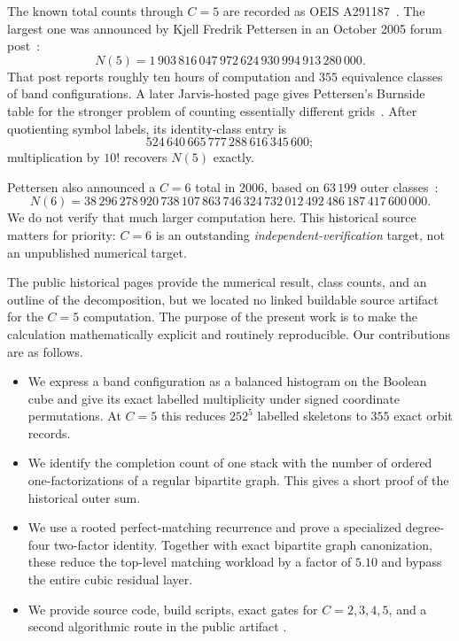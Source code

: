 \documentclass[11pt]{article}
\theoremstyle{definition}
\theoremstyle{remark}
\newcommand{\Nfive}{1\,903\,816\,047\,972\,624\,930\,994\,913\,280\,000}
\begin{document}
The known total counts through $C=5$ are recorded as OEIS
A291187~\cite{oeisA291187}.  The largest one was announced by Kjell Fredrik
Pettersen in an October 2005 forum post~\cite{pettersen2005c5}:
\[
  N(5)=\Nfive.
\]
That post reports roughly ten hours of computation and $355$ equivalence
classes of band configurations.  A later Jarvis-hosted page gives
Pettersen's Burnside table for the stronger problem of counting essentially
different grids~\cite{pettersen2008symmetry}.  After quotienting symbol
labels, its identity-class entry is
\[
  524\,640\,665\,777\,288\,616\,345\,600;
\]
multiplication by $10!$ recovers $N(5)$ exactly.

Pettersen also announced a $C=6$ total in 2006, based on $63\,199$ outer
classes~\cite{pettersen2006c6}:
\[
  N(6)=38\,296\,278\,920\,738\,107\,863\,746\,324\,732\,012\,492\,486\,187\,417\,600\,000.
\]
We do not verify that much larger computation here.  This historical source
matters for priority: $C=6$ is an outstanding
\emph{independent-verification} target, not an unpublished numerical target.

The public historical pages provide the numerical result, class counts, and
an outline of the decomposition, but we located no linked buildable source
artifact for the $C=5$ computation.  The purpose of the present work is to
make the calculation mathematically explicit and routinely reproducible.
Our contributions are as follows.

\begin{itemize}
  \item We express a band configuration as a balanced histogram on the
        Boolean cube and give its exact labelled multiplicity under signed
        coordinate permutations.  At $C=5$ this reduces $252^5$ labelled
        skeletons to $355$ exact orbit records.
  \item We identify the completion count of one stack with the number of
        ordered one-factorizations of a regular bipartite graph.  This gives
        a short proof of the historical outer sum.
  \item We use a rooted perfect-matching recurrence and prove a specialized
        degree-four two-factor identity.  Together with exact bipartite graph
        canonization, these reduce the top-level matching workload by a
        factor of $5.10$ and bypass the entire cubic residual layer.
  \item We provide source code, build scripts, exact gates for $C=2,3,4,5$,
        and a second algorithmic route in the public artifact
        \cite{artifact2026}.
\end{itemize}
\end{document}
